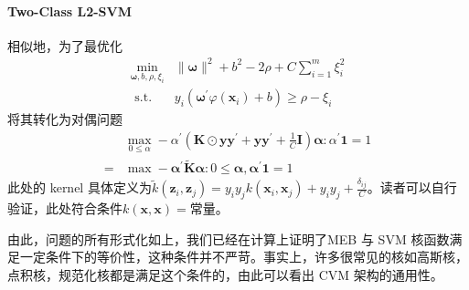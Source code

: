 \documentclass[UTF8, fleqn,10pt]{SelfArx} %
\begin{document}
		\paragraph{Two-Class L2-SVM}
		相似地，为了最优化
		\begin{equation}
		\begin{array}{cl}\min _{\mathbf{\omega}, b, \rho, \xi_{i}} & \|\mathbf{\omega}\|^{2}+b^{2}-2 \rho+C \sum_{i=1}^{m} \xi_{i}^{2} \\ \text { s.t. } & y_{i}\left(\mathbf{\omega}^{\prime} \varphi\left(\mathbf{x}_{i}\right)+b\right) \geq \rho-\xi_{i}\end{array}
		\end{equation}
		将其转化为对偶问题
		$$
		\begin{aligned} & \max _{0 \leq \alpha}-\alpha^{\prime}\left(\mathbf{K} \odot \mathbf{y y}^{\prime}+\mathbf{y y}^{\prime}+\frac{1}{C} \mathbf{I}\right) \boldsymbol{\alpha}: \alpha^{\prime} \mathbf{1}=1 \\=& \max -\boldsymbol{\alpha}^{\prime} \tilde{\mathbf{K}} \boldsymbol{\alpha}: 0 \leq \boldsymbol{\alpha}, \boldsymbol{\alpha}^{\prime} \mathbf{1}=1 \end{aligned}$$
		此处的 kernel 具体定义为$\tilde{k}\left(\mathbf{z}_{i}, \mathbf{z}_{j}\right)=y_{i} y_{j} k\left(\mathbf{x}_{i}, \mathbf{x}_{j}\right)+y_{i} y_{j}+\frac{\delta_{i j}}{C}$。读者可以自行验证，此处符合条件$k(\mathbf{x}, \mathbf{x})=$常量。\par
		由此，问题的所有形式化如上，我们已经在计算上证明了MEB 与 SVM 核函数满足一定条件下的等价性，这种条件并不严苛。事实上，许多很常见的核如高斯核，点积核，规范化核都是满足这个条件的，由此可以看出 CVM 架构的通用性。
\end{document}
